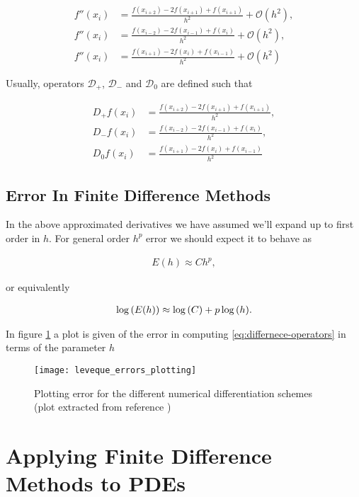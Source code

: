 \begin{align}
	f''(x_i) &= \frac{f(x_{i+2})-2f(x_{i+1})+f(x_{i+1})}{h^2} + \mathcal{O}(h^2),\\
	f''(x_i) &= \frac{f(x_{i-2})-2f(x_{i-1})+f(x_i)}{h^2} + \mathcal{O}(h^2),\\
	f''(x_i) &= \frac{f(x_{i+1})-2f(x_i)+f(x_{i-1})}{h^2} + \mathcal{O}(h^2)
\end{align}

Usually, operators $\mathcal{D_+}$, $\mathcal{D_-}$ and $\mathcal{D_0}$ are defined such that

\begin{align}
	\label{eq:differnece-operators}
	D_+f(x_i) &= \frac{f(x_{i+2})-2f(x_{i+1})+f(x_{i+1})}{h^2},\\
	D_-f(x_i) &= \frac{f(x_{i-2})-2f(x_{i-1})+f(x_i)}{h^2},\\
	D_0f(x_i) &= \frac{f(x_{i+1})-2f(x_i)+f(x_{i-1})}{h^2}
\end{align}


\subsection{Error In Finite Difference Methods}


In the above approximated derivatives we have assumed we'll expand up to first order in $h$. For general order $h^p$ error we should expect it to behave as \cite{leveque_ch1}

\begin{align}
	E(h)\approx Ch^p,
\end{align}

or equivalently

\begin{align}
	\log\left({E(h)}\right)\approx \log\left({C}\right)+p\log{ \left({h}\right) }.
\end{align}

In figure \ref{fig:leveque_errors_plotting} a plot is given of the error in computing \ref{eq:differnece-operators} in terms of the parameter $h$



\begin{figure}[h!]
\centering
	\texttt{[image: leveque\_errors\_plotting]}
	\caption{Plotting error for the different numerical differentiation schemes (plot extracted from reference \cite{leveque_ch1})}
\label{fig:leveque_errors_plotting}
\end{figure}


\section{Applying Finite Difference Methods to PDEs}

